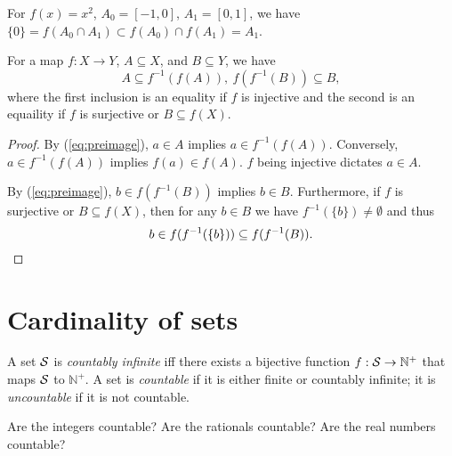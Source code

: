\begin{exm}
  For $f(x)=x^2$, $A_0=[-1,0]$, $A_1=[0,1]$,
  we have $\{0\}=f(A_0\cap A_1)\subset f(A_0)\cap f(A_1)=A_1$.
\end{exm}

\begin{lem}
  \label{lem:preimageSubsetIdentites}
  For a map $f: X\rightarrow Y$, $A\subseteq X$,
  and $B\subseteq Y$,
  we have
  \begin{equation}
    \label{eq:preimageSubsetIdentites}
    A \subseteq f^{-1}(f(A)),\
    f(f^{-1}(B))\subseteq B,
  \end{equation}
  where the first inclusion
  is an equality if $f$ is injective 
  and the second is an equaility
  if $f$ is surjective or $B\subseteq f(X)$.
\end{lem}
\begin{proof}
  By (\ref{eq:preimage}), $a\in A$ implies
  $a\in f^{-1}(f(A))$.
  Conversely, $a\in f^{-1}(f(A))$ implies
   $f(a)\in f(A)$.
   $f$ being injective dictates $a\in A$.

  By (\ref{eq:preimage}), $b\in f(f^{-1}(B))$ implies
  $b\in B$.
  Furthermore, if $f$ is surjective or $B\subseteq f(X)$,
  then for any $b\in B$ we have $f^{-1}(\{b\})\ne \emptyset$
  and thus
  \begin{displaymath}
    b\in f(f^{-1}(\{b\})) \subseteq f(f^{-1}(B)).\qedhere
  \end{displaymath}
\end{proof}


\section{Cardinality of sets}
\label{sec:count-unco-sets}

\begin{defn}
  \label{def:countability}
  A set ${\cal S}$ is \emph{countably infinite}
   iff there exists a bijective function
   $f:{\cal S}\rightarrow \mathbb{N}^+$
   that maps ${\cal S}$ to $\mathbb{N}^+$.
  A set is \emph{countable}
  if it is either finite or countably infinite;
  it is \emph{uncountable}
  if it is not countable.
\end{defn}

\begin{exc}
  Are the integers countable?
  Are the rationals countable?
  Are the real numbers countable?
\end{exc}

